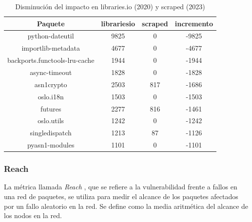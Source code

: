 \begin{table}[h!]
    \centering
    \label{tab:Disminución del impacto en libraries.io y scraped}
    \begin{tabular}{|c|c|c|c|}
        \hline
        \textbf{Paquete}              & \textbf{librariesio} & \textbf{scraped} & \textbf{incremento} \\
        \hline
        python-dateutil               & 9825                 & 0                & -9825               \\
        importlib-metadata            & 4677                 & 0                & -4677               \\
        backports.functools-lru-cache & 1944                 & 0                & -1944               \\
        async-timeout                 & 1828                 & 0                & -1828               \\
        asn1crypto                    & 2503                 & 817              & -1686               \\
        oslo.i18n                     & 1503                 & 0                & -1503               \\
        futures                       & 2277                 & 816              & -1461               \\
        oslo.utils                    & 1242                 & 0                & -1242               \\
        singledispatch                & 1213                 & 87               & -1126               \\
        pyasn1-modules                & 1101                 & 0                & -1101               \\
        \hline
    \end{tabular}
    \caption{Disminución del impacto en libraries.io (2020) y scraped (2023)}
\end{table}




\subsubsection{Reach}

La métrica llamada \emph{Reach} , que se refiere a la vulnerabilidad
frente a fallos en una red de paquetes, se utiliza para medir el alcance de los paquetes afectados
por un fallo aleatorio en la red. Se define como la media aritmética del alcance de los nodos
en la red.

